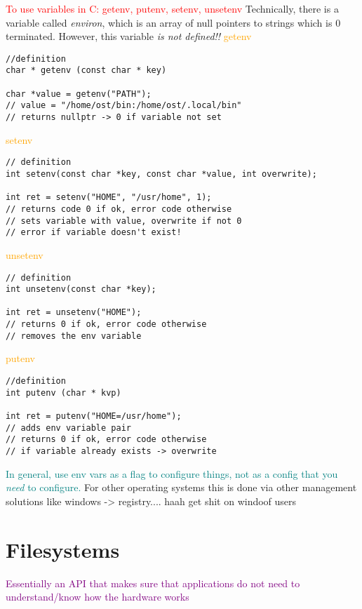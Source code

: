 \documentclass[main.tex,fontsize=8pt,paper=a4,paper=portrait,DIV=calc,]{scrartcl}
\begin{document}
\textcolor{red}{To use variables in C: getenv, putenv, setenv, unsetenv}\newline
Technically, there is a variable called \emph{environ}, which is an array of null pointers to strings which is 0 terminated.\newline
However, this variable \emph{is not defined!!} \newline
\textcolor{orange}{getenv}
\begin{lstlisting}
//definition 
char * getenv (const char * key)

char *value = getenv("PATH");
// value = "/home/ost/bin:/home/ost/.local/bin"
// returns nullptr -> 0 if variable not set
\end{lstlisting}
\textcolor{orange}{setenv}
\begin{lstlisting}
// definition 
int setenv(const char *key, const char *value, int overwrite);

int ret = setenv("HOME", "/usr/home", 1);
// returns code 0 if ok, error code otherwise 
// sets variable with value, overwrite if not 0
// error if variable doesn't exist!
\end{lstlisting}
\textcolor{orange}{unsetenv}
\begin{lstlisting}
// definition
int unsetenv(const char *key);

int ret = unsetenv("HOME");
// returns 0 if ok, error code otherwise
// removes the env variable
\end{lstlisting}
\textcolor{orange}{putenv}
\begin{lstlisting}
//definition
int putenv (char * kvp)

int ret = putenv("HOME=/usr/home");
// adds env variable pair
// returns 0 if ok, error code otherwise
// if variable already exists -> overwrite
\end{lstlisting}

\textcolor{teal}{In general, use env vars as a flag to configure things, not as a config that you \emph{need} to configure.}\newline
For other operating systems this is done via other management solutions like windows -> registry.... haah get shit on windoof users

\section{Filesystems}
\textcolor{purple}{Essentially an API that makes sure that applications do not need to understand/know how the hardware works}
\end{document}
